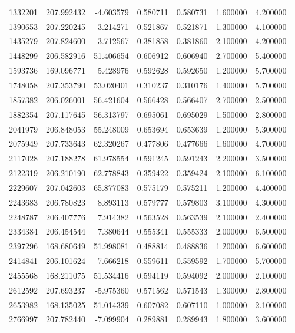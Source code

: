\begin{tabular}{lrrrrrr}
1332201 & 207.992432 & -4.603579 & 0.580711 & 0.580731 & 1.600000 & 4.200000 \\
1390653 & 207.220245 & -3.214271 & 0.521867 & 0.521871 & 1.300000 & 4.100000 \\
1435279 & 207.824600 & -3.712567 & 0.381858 & 0.381860 & 2.100000 & 4.200000 \\
1448299 & 206.582916 & 51.406654 & 0.606912 & 0.606940 & 2.700000 & 5.400000 \\
1593736 & 169.096771 & 5.428976 & 0.592628 & 0.592650 & 1.200000 & 5.700000 \\
1748058 & 207.353790 & 53.020401 & 0.310237 & 0.310176 & 1.400000 & 5.700000 \\
1857382 & 206.026001 & 56.421604 & 0.566428 & 0.566407 & 2.700000 & 2.500000 \\
1882354 & 207.117645 & 56.313797 & 0.695061 & 0.695029 & 1.500000 & 2.800000 \\
2041979 & 206.848053 & 55.248009 & 0.653694 & 0.653639 & 1.200000 & 5.300000 \\
2075949 & 207.733643 & 62.320267 & 0.477806 & 0.477666 & 1.600000 & 4.700000 \\
2117028 & 207.188278 & 61.978554 & 0.591245 & 0.591243 & 2.200000 & 3.500000 \\
2122319 & 206.210190 & 62.778843 & 0.359422 & 0.359424 & 2.100000 & 6.100000 \\
2229607 & 207.042603 & 65.877083 & 0.575179 & 0.575211 & 1.200000 & 4.400000 \\
2243683 & 206.780823 & 8.893113 & 0.579777 & 0.579803 & 3.100000 & 4.300000 \\
2248787 & 206.407776 & 7.914382 & 0.563528 & 0.563539 & 2.100000 & 2.400000 \\
2334384 & 206.454544 & 7.380644 & 0.555341 & 0.555333 & 2.000000 & 6.500000 \\
2397296 & 168.680649 & 51.998081 & 0.488814 & 0.488836 & 1.200000 & 6.600000 \\
2414841 & 206.101624 & 7.666218 & 0.559611 & 0.559592 & 1.700000 & 5.700000 \\
2455568 & 168.211075 & 51.534416 & 0.594119 & 0.594092 & 2.000000 & 2.100000 \\
2612592 & 207.693237 & -5.975360 & 0.571562 & 0.571543 & 1.300000 & 2.800000 \\
2653982 & 168.135025 & 51.014339 & 0.607082 & 0.607110 & 1.000000 & 2.100000 \\
2766997 & 207.782440 & -7.099904 & 0.289881 & 0.289943 & 1.800000 & 3.600000 \\

\end{tabular}
